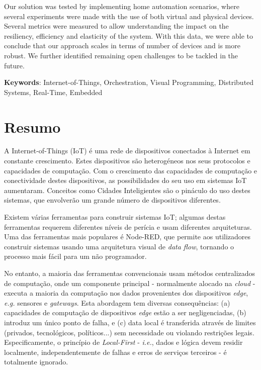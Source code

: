 Our solution was tested by implementing home automation scenarios, where several experiments were made with the use of both virtual and physical devices. Several metrics were measured to allow understanding the impact on the resiliency, efficiency and elasticity of the system. With this data, we were able to conclude that our approach scales in terms of number of devices and is more robust. We further identified remaining open challenges to be tackled in the future.

\vspace*{10mm}\noindent

\textbf{Keywords}: Internet-of-Things, Orchestration, Visual Programming, Distributed Systems, Real-Time, Embedded


\chapter*{Resumo}

A Internet-of-Things (IoT) é uma rede de dispositivos conectados à Internet em constante crescimento. Estes dispositivos são heterogéneos nos seus protocolos e capacidades de computação. Com o crescimento das capacidades de computação e conectividade destes dispositivos, as possibilidades do seu uso em sistemas IoT aumentaram. Conceitos como Cidades Inteligientes são o pináculo do uso destes sistemas, que envolverão um grande número de dispositivos diferentes.

Existem várias ferramentas para construir sistemas IoT; algumas destas ferramentas requerem diferentes níveis de perícia e usam diferentes arquiteturas. Uma das ferramentas mais populares é Node-RED, que permite aos utilizadores construir sistemas usando uma arquitetura visual de \emph{data flow}, tornando o processo mais fácil para um não programador.

No entanto, a maioria das ferramentas convencionais usam métodos centralizados de computação, onde um componente principal - normalmente alocado na \emph{cloud} - executa a maioria da computação nos dados provenientes dos dispositivos \emph{edge}, \emph{e.g.} sensores e \emph{gateways}. Esta abordagem tem diversas consequências: (a) capacidades de computação de dispositivos \emph{edge} estão a ser negligenciadas, (b) introduz um único ponto de falha, e (c) data local é transferida através de limites (privados, tecnológicos, políticos...) sem necessidade ou violando restrições legais. Especificamente, o princípio de \emph{Local-First} - \emph{i.e.}, dados e lógica devem residir localmente, independentemente de falhas e erros de serviços terceiros - é totalmente ignorado.

